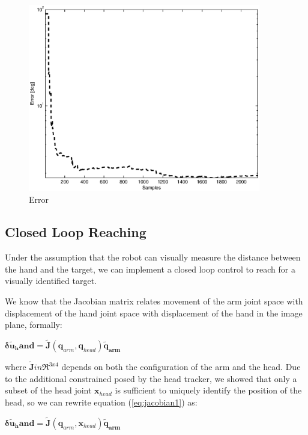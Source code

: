 \begin{figure}[tbp]
\label{fig:reaching-error}
\centerline{
\includegraphics[width=4.0in, angle=0 ]{./Figure/reachingError1.eps}
} \caption{Error} 
\end{figure}

\subsection{Closed Loop Reaching}
%
Under the assumption that the robot can visually measure the distance
between the hand and the target, we can implement a closed loop 
control to reach for a visually identified target.

We know that the Jacobian matrix relates movement of the arm 
joint space with displacement of the hand 
joint space with displacement of the hand 
in the image plane, formally:
%
\begin{center} 
\begin{math}
\label{eq:jacobian1}
  \mathbf{\delta \tilde{u}_hand}=
  \tilde{\mathbf J}\left(\mathbf q_{arm}, \mathbf q_{head}\right)
  \mathbf{\tilde{q}_{arm}}
\end{math}
\end{center}
%
where $\tilde{\mathbf J} in \Re^{3x4}$ depends on 
both the configuration of the arm and the head. Due to the 
additional constrained posed by the head tracker, we showed
that only a subset of the head joint $\mathbf x_{head}$ is 
sufficient to uniquely identify the position of the head, so we 
can rewrite equation (\ref{eq:jacobian1}) as:
%
\begin{center} 
\begin{math}
\label{eq:jacobian2}
  \mathbf{\delta \tilde{u}_hand}=
  \tilde{\mathbf J}\left(\mathbf q_{arm}, \mathbf x_{head}\right)
  \mathbf{\tilde{q}_{arm}}
\end{math}
\end{center}
%

